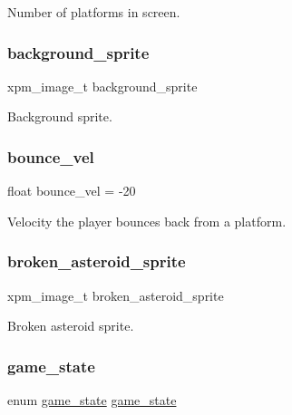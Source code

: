 Number of platforms in screen. 

\mbox{\label{group__Game_ga5a4cfb92e48a82e5d50c87e4bc632970}} 
\subsubsection{\texorpdfstring{background\+\_\+sprite}{background\_sprite}}
{\footnotesize\ttfamily xpm\+\_\+image\+\_\+t background\+\_\+sprite}



Background sprite. 

\mbox{\label{group__Game_ga223eb1bebc2dce2b95cb54c56c82b040}} 
\subsubsection{\texorpdfstring{bounce\+\_\+vel}{bounce\_vel}}
{\footnotesize\ttfamily float bounce\+\_\+vel = -\/20}



Velocity the player bounces back from a platform. 

\mbox{\label{group__Game_ga06a70f098733d826cb9d8e81e7104983}} 
\subsubsection{\texorpdfstring{broken\+\_\+asteroid\+\_\+sprite}{broken\_asteroid\_sprite}}
{\footnotesize\ttfamily xpm\+\_\+image\+\_\+t broken\+\_\+asteroid\+\_\+sprite}



Broken asteroid sprite. 

\mbox{\label{group__Game_ga38caf7c28534bcd60ff95faf7fcae2d7}} 
\subsubsection{\texorpdfstring{game\+\_\+state}{game\_state}}
{\footnotesize\ttfamily enum \hyperlink{group__utils_gad0ed1832dd134806ad335cdcc1a59ad2}{game\+\_\+state} \hyperlink{group__utils_gad0ed1832dd134806ad335cdcc1a59ad2}{game\+\_\+state}}



